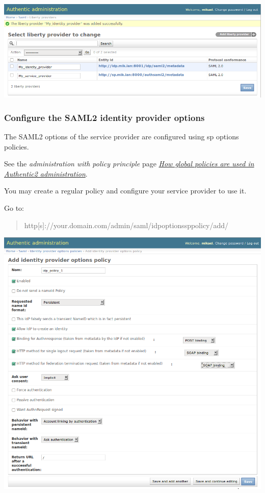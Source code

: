 \documentclass[letterpaper,10pt,english]{sphinxmanual}
\begin{document}
\includegraphics{new_saml2_idp_saved.png}


\subsubsection{Configure the SAML2 identity provider options}
\label{config_saml2_idp:configure-the-saml2-identity-provider-options}
The SAML2 options of the service provider are configured using sp options
policies.

See the \emph{administration with policy principle} page {\hyperref[administration_with_policies:administration-with-policies]{\emph{How global policies are used in Authentic2 administration}}}.

You may create a regular policy and configure your service provider to use it.

Go to:
\begin{quote}

http{[}s{]}://your.domain.com/admin/saml/idpoptionssppolicy/add/
\end{quote}

\includegraphics{sp_options_regular.png}
\end{document}
